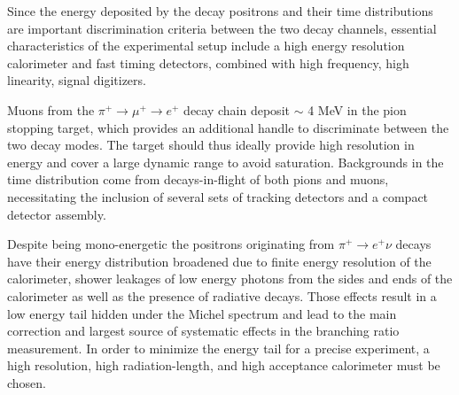 Since the energy deposited by the decay positrons and their time distributions are important discrimination criteria between the two decay channels,  essential characteristics of the experimental setup  include a high energy resolution calorimeter and fast timing detectors, combined with high frequency, high linearity, signal digitizers.

Muons from  the $\pi^+ \rightarrow \mu^+ \rightarrow e^+$ decay chain deposit $\sim$ 4 MeV in the pion stopping target, which provides an additional handle to discriminate between the two decay modes. The target should thus ideally provide high resolution in energy and cover a large dynamic range to avoid saturation. 
Backgrounds in the time distribution come from decays-in-flight of both pions and muons, necessitating the inclusion of several sets of tracking detectors and a compact detector assembly.

Despite being  mono-energetic the positrons originating from $\pi^+ \rightarrow e^+ \nu$ decays have their energy distribution broadened due to finite energy resolution of the calorimeter, shower leakages of low energy photons from the sides and ends of the calorimeter as well as the presence of radiative decays. Those effects result in a low energy tail hidden under the Michel spectrum and lead to the main correction and largest source of systematic effects in the branching ratio measurement. In order to minimize the energy tail for a precise experiment, a high resolution,  high radiation-length, and high acceptance calorimeter must be chosen.     

